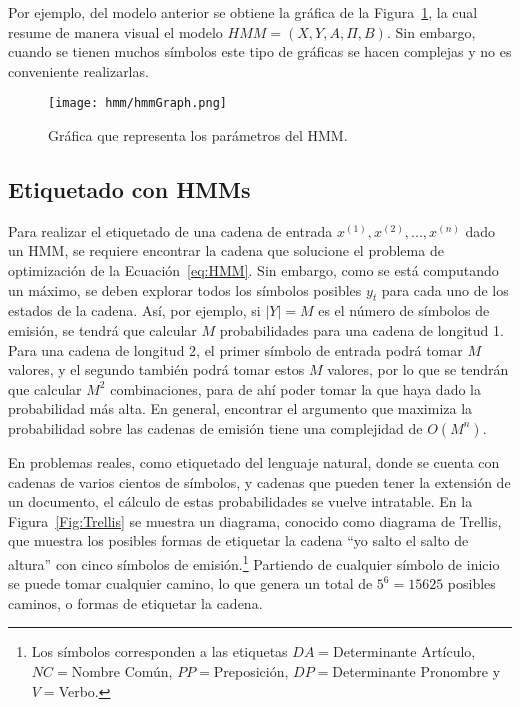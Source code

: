  Por ejemplo, del modelo anterior se obtiene la gráfica de la Figura~\ref{Fig:hmmGraph}, la cual resume de manera visual el modelo $HMM = (X,Y, A,\Pi, B)$. Sin embargo, cuando se tienen muchos símbolos este tipo de gráficas se hacen complejas y no es conveniente realizarlas.


\begin{figure}
 \centering
 \texttt{[image: hmm/hmmGraph.png]}
 \caption{Gráfica que representa los parámetros del HMM.}\label{Fig:hmmGraph}
\end{figure}





\subsection{Etiquetado con HMMs}

Para realizar el etiquetado de una cadena de entrada $x^{(1)}, x^{(2)},...,x^{(n)}$ dado un HMM, se requiere encontrar la cadena que solucione el problema de optimización de la Ecuación~\ref{eq:HMM}. Sin embargo, como se está computando un máximo, se deben explorar todos los símbolos posibles $y_t$ para cada uno de los estados de la cadena. Así, por ejemplo, si $|Y| = M$ es el número de símbolos de emisión, se tendrá que calcular $M$ probabilidades para una cadena de longitud 1. Para una cadena de longitud 2, el primer símbolo de entrada podrá tomar $M$ valores, y el segundo también podrá tomar estos $M$ valores, por lo que se tendrán que calcular $M^2$ combinaciones, para de ahí poder tomar la que haya dado la probabilidad más alta. En general, encontrar el argumento que maximiza la probabilidad sobre las cadenas de emisión tiene una complejidad de $O(M^n)$.

En problemas reales, como etiquetado del lenguaje natural, donde se cuenta con cadenas de varios cientos de símbolos, y cadenas que pueden tener la extensión de un documento, el cálculo de estas probabilidades se vuelve intratable. En la Figura~\ref{Fig:Trellis} se muestra un diagrama, conocido como diagrama de Trellis, que muestra los posibles formas de etiquetar la cadena ``yo salto el salto de altura'' con cinco símbolos de emisión.\footnote{Los símbolos corresponden a las etiquetas $DA=$Determinante Artículo, $NC=$Nombre Común, $PP=$Preposición, $DP=$Determinante Pronombre y $V=$Verbo.} Partiendo de cualquier símbolo de inicio se puede tomar cualquier camino, lo que genera un total de $5^6=15 625$ posibles caminos, o formas de etiquetar la cadena.


